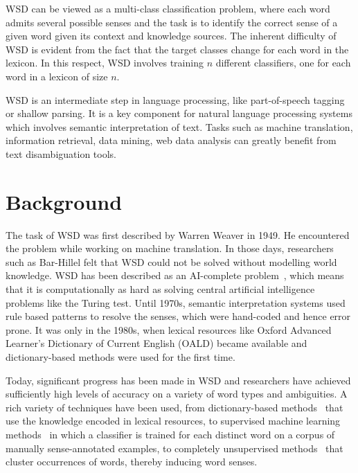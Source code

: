 \documentclass[12pt,letterpaper]{article}
\newcommand{\blue}[1]{\textcolor{RoyalBlue}{#1}}
\newcommand{\instructions}[1]{\blue{\textit{#1}}}
\begin{document}
WSD can be viewed as a multi-class classification problem, where each word admits several possible senses and the task is to identify the correct sense of a given word given its context and knowledge sources. The inherent difficulty of WSD is evident from the fact that the target classes change for each word in the lexicon. In this respect, WSD involves training $n$ different classifiers, one for each word in a lexicon of size $n$. 

WSD is an intermediate step in language processing, like part-of-speech tagging or shallow parsing. It is a key component for natural language processing systems which involves semantic interpretation of text. Tasks such as machine translation, information retrieval, data mining, web data analysis can greatly benefit from text disambiguation tools. 


\section{Background}
\label{sec:background}

The task of WSD was first described by Warren Weaver in 1949. He encountered the problem while working on machine translation. In those days, researchers such as Bar-Hillel felt that WSD could not be solved without modelling world knowledge. WSD has been described as an AI-complete problem~\cite{mallery1988thinking}, which means that it is computationally as hard as solving central artificial intelligence problems like the Turing test. Until 1970s, semantic interpretation systems used rule based patterns to resolve the senses, which were hand-coded and hence error prone. It was only in the 1980s, when lexical resources like Oxford Advanced Learner's Dictionary of Current English (OALD) became available and dictionary-based methods were used for the first time. 

Today, significant progress has been made in WSD and researchers have achieved sufficiently high levels of accuracy on a variety of word types and ambiguities. A rich variety of techniques have been used, from dictionary-based methods~\cite{mihalcea2007using} that use the knowledge encoded in lexical resources, to supervised machine learning methods~\cite{manning1999foundations} in which a classifier is trained for each distinct word on a corpus of manually sense-annotated examples, to completely unsupervised methods~\cite{yarowsky1995unsupervised} that cluster occurrences of words, thereby inducing word senses.
\end{document}
